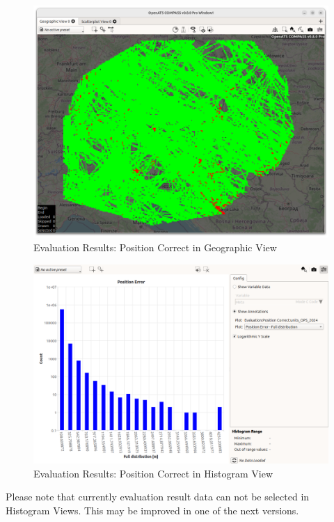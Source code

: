 \begin{figure}[H]
  \hspace*{-2.5cm}
    \includegraphics[width=19cm]{figures/geo_eval_pos_correct.png}
  \caption{Evaluation Results: Position Correct in Geographic View}
\end{figure}

\begin{figure}[H]
  \hspace*{-2.5cm}
    \includegraphics[width=19cm,frame]{figures/histogram_eval_pos_correct.png}
  \caption{Evaluation Results: Position Correct in Histogram View}
\end{figure}

Please note that currently evaluation result data can not be selected in Histogram Views. This may be improved in one of the next versions. \\

